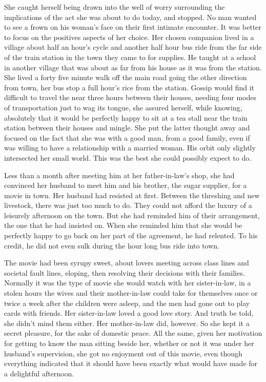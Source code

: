 \documentclass{article}
\newcommand{\egnote}{\todo[color=violet!30]}
\begin{document}
\egnote{back to 8mo ago, then flashbacks to relationship development}
She caught herself being drawn into the well of worry surrounding the implications of the act she was about to do today, and stopped. No man wanted to see a frown on his woman's face on their first intimate encounter. It was better to focus on the positives aspects of her choice. Her chosen companion lived in a village about half an hour's cycle and another half hour bus ride from the far side of the train station in the town they came to for supplies. He taught at a school in another village that was about as far from his house as it was from the station. She lived a forty five minute walk off the main road going the other direction from town, her bus stop a full hour's rice from the station. Gossip would find it difficult to travel the near three hours between their houses, needing four modes of transportation just to wag its tongue, she assured herself, while knowing, absolutely that it would be perfectly happy to sit at a tea stall near the train station between their houses and mingle. She put the latter thought away and focused on the fact that she was with a good man, from a good family, even if was willing to have a relationship with a married woman. His orbit only slightly intersected her small world. This was the best she could possibly expect to do.

Less than a month after meeting him at her father-in-law's shop, she had convinced her husband to meet him and his brother, the sugar supplier, for a movie in town. Her husband had resisted at first. Between the threshing and new livestock, there was just too much to do. They could not afford the luxury of a leisurely afternoon on the town. But she had reminded him of their arrangement, the one that he had insisted on. When she reminded him that she would be perfectly happy to go back on her part of the agreement, he had relented. To his credit, he did not even sulk during the hour long bus ride into town.

The movie had been syrupy sweet, about lovers meeting across class lines and societal fault lines, eloping, then resolving their decisions with their families. Normally it was the type of movie she would watch with her sister-in-law, in a stolen hours the wives and their mother-in-law could take for themselves once or twice a week after the children were asleep, and the men had gone out to play cards with friends. Her sister-in-law loved a good love story. And truth be told, she didn't mind them either. Her mother-in-law did, however. So she kept it a secret pleasure, for the sake of domestic peace. All the same, given her motivation for getting to know the man sitting beside her, whether or not it was under her husband's supervision, she got no enjoyment out of this movie, even though everything indicated that it should have been exactly what would have made for a delightful afternoon. 
\end{document}
